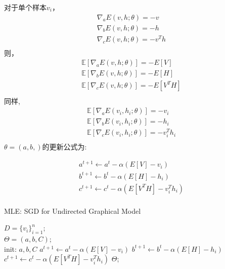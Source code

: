 \documentclass[UTF8]{ctexart}
\numberwithin{equation}{section}
\begin{document}
对于单个样本$v_i$，
\begin{gather*}
    \nabla_aE(v,h;\theta) = -v \\
    \nabla_bE(v,h;\theta) = -h \\
    \nabla_cE(v,h;\theta) = -v^Th \\
\end{gather*}
则，
\begin{gather*}
    \mathbb{E}[\nabla_aE(v,h;\theta)] = -E[V] \\
    \mathbb{E}[\nabla_bE(v,h;\theta)] = -E[H] \\
    \mathbb{E}[\nabla_cE(v,h;\theta)] = -E[V^TH]  \\
\end{gather*}
同样,
\begin{gather*}
    \mathbb{E}[\nabla_aE(v_i,h_i;\theta)] = -v_i \\
    \mathbb{E}[\nabla_bE(v_i,h_i;\theta)] = -h_i \\
    \mathbb{E}[\nabla_cE(v_i,h_i;\theta)] = -v_i^T h_i \\
\end{gather*}
$\theta=(a,b,)$的更新公式为:

\begin{equation}
    \begin{gathered}
        a^{t+1} \leftarrow a^t - \alpha(E[V]-v_i) \\
        b^{t+1} \leftarrow b^t - \alpha(E[H]-h_i) \\
        c^{t+1} \leftarrow c^t - \alpha(E[V^T H] - v_i^Th_i) \\
    \end{gathered}
\end{equation}


\begin{algorithm}[htb]
    \caption{MLE: SGD for Undirected Graphical Model}
    \label{alg:A10_1}
    \begin{algorithmic}[1]
    \REQUIRE
    $D=\{v_i\}_{i=1}^n$;\\
    \ENSURE 
    $\Theta=(a,b,C)$; \\
    \STATE init: $a,b,C$
    \REPEAT 
    \STATE $a^{t+1} \leftarrow a^t - \alpha(E[V]-v_i)$
    \STATE $b^{t+1} \leftarrow b^t - \alpha(E[H]-h_i)$
    \STATE $c^{t+1} \leftarrow c^t - \alpha(E[V^T H] - v_i^Th_i)$
    \UNTIL 
    \RETURN $\Theta$;
    \end{algorithmic}
\end{algorithm}
\end{document}
